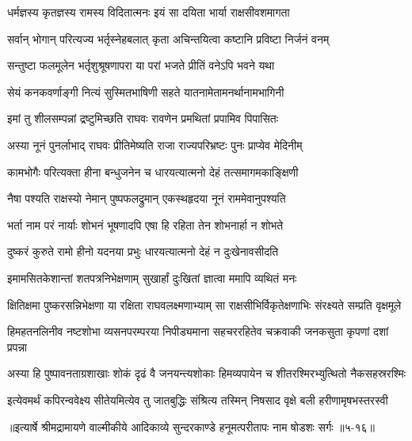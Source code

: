 \twolineshloka
{धर्मज्ञस्य कृतज्ञस्य रामस्य विदितात्मनः}
{इयं सा दयिता भार्या राक्षसीवशमागता} %

\twolineshloka
{सर्वान् भोगान् परित्यज्य भर्तृस्नेहबलात् कृता}
{अचिन्तयित्वा कष्टानि प्रविष्टा निर्जनं वनम्} %

\twolineshloka
{सन्तुष्टा फलमूलेन भर्तृशुश्रूषणापरा}
{या परां भजते प्रीतिं वनेऽपि भवने यथा} %

\twolineshloka
{सेयं कनकवर्णाङ्गी नित्यं सुस्मितभाषिणी}
{सहते यातनामेतामनर्थानामभागिनी} %

\twolineshloka
{इमां तु शीलसम्पन्नां द्रष्टुमिच्छति राघवः}
{रावणेन प्रमथितां प्रपामिव पिपासितः} %

\twolineshloka
{अस्या नूनं पुनर्लाभाद् राघवः प्रीतिमेष्यति}
{राजा राज्यपरिभ्रष्टः पुनः प्राप्येव मेदिनीम्} %

\twolineshloka
{कामभोगैः परित्यक्ता हीना बन्धुजनेन च}
{धारयत्यात्मनो देहं तत्समागमकाङ्क्षिणी} %

\twolineshloka
{नैषा पश्यति राक्षस्यो नेमान् पुष्पफलद्रुमान्}
{एकस्थहृदया नूनं राममेवानुपश्यति} %

\twolineshloka
{भर्ता नाम परं नार्याः शोभनं भूषणादपि}
{एषा हि रहिता तेन शोभनार्हा न शोभते} %

\twolineshloka
{दुष्करं कुरुते रामो हीनो यदनया प्रभुः}
{धारयत्यात्मनो देहं न दुःखेनावसीदति} %

\twolineshloka
{इमामसितकेशान्तां शतपत्रनिभेक्षणाम्}
{सुखार्हां दुःखितां ज्ञात्वा ममापि व्यथितं मनः} %

\twolineshloka
{क्षितिक्षमा पुष्करसन्निभेक्षणा या रक्षिता राघवलक्ष्मणाभ्याम्}
{सा राक्षसीभिर्विकृतेक्षणाभिः संरक्ष्यते सम्प्रति वृक्षमूले} %

\twolineshloka
{हिमहतनलिनीव नष्टशोभा व्यसनपरम्परया निपीड्यमाना}
{सहचररहितेव चक्रवाकी जनकसुता कृपणां दशां प्रपन्ना} %

\twolineshloka
{अस्या हि पुष्पावनताग्रशाखाः शोकं दृढं वै जनयन्त्यशोकाः}
{हिमव्यपायेन च शीतरश्मिरभ्युत्थितो नैकसहस्ररश्मिः} %

\twolineshloka
{इत्येवमर्थं कपिरन्ववेक्ष्य सीतेयमित्येव तु जातबुद्धिः}
{संश्रित्य तस्मिन् निषसाद वृक्षे बली हरीणामृषभस्तरस्वी} %


॥इत्यार्षे श्रीमद्रामायणे वाल्मीकीये आदिकाव्ये सुन्दरकाण्डे हनूमत्परीतापः नाम षोडशः सर्गः ॥५-१६॥
